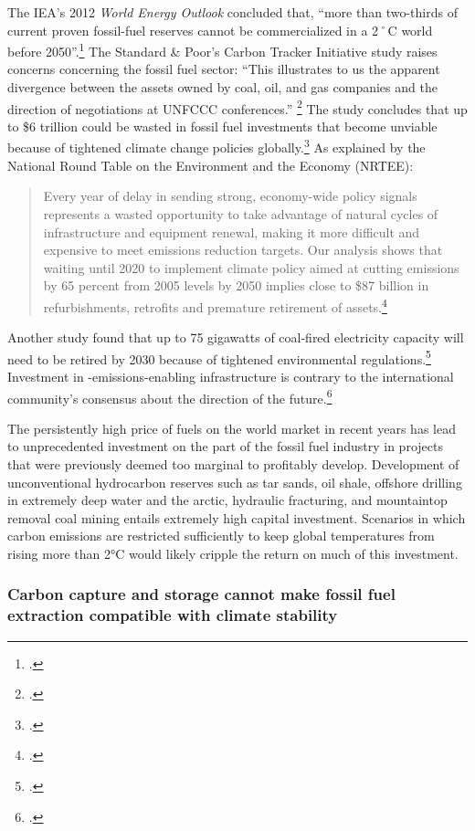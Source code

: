 \documentclass[10pt]{article}
\begin{document}
The IEA's 2012 \emph{World Energy Outlook} concluded that, ``more than two-thirds of current proven fossil-fuel reserves cannot be commercialized in a 2˚C world before 2050''.\footcite{IEA2012}
The Standard \& Poor's Carbon Tracker Initiative study raises concerns concerning the fossil fuel sector: ``This illustrates to us the apparent divergence between the assets owned by coal, oil, and gas companies and the direction of negotiations at UNFCCC conferences.'' \footcite{SandPConstrained}
The study concludes that up to \$6 trillion could be wasted in fossil fuel investments that become unviable because of tightened climate change policies globally.\footcite[][]{SixTrillionBubble}
As explained by the National Round Table on the Environment and the Economy (NRTEE):
\begin{quote}
Every year of delay in sending strong, economy-wide policy signals represents a wasted opportunity to take advantage of natural cycles of infrastructure and equipment renewal, making it more difficult and expensive to meet emissions reduction targets. Our analysis shows that waiting until 2020 to implement climate policy aimed at cutting emissions by 65 percent from 2005 levels by 2050 implies close to \$87 billion in refurbishments, retrofits and premature retirement of assets.\footcite[][p. 19]{FramingFuture}
\end{quote}
Another study found that up to 75 gigawatts of coal-fired electricity capacity will need to be retired by 2030 because of tightened environmental regulations.\footcite[][p. 10]{RisksInCoal}
Investment in -emissions-enabling infrastructure is contrary to the international community's consensus about the direction of the future.\footcite[][]{Watkins2013}



The persistently high price of fuels on the world market in recent years has lead to unprecedented investment on the part of the fossil fuel industry in projects that were previously deemed too marginal to profitably develop. 
Development of unconventional hydrocarbon reserves such as tar sands, oil shale, offshore drilling in extremely deep water and the arctic, hydraulic fracturing, and mountaintop removal coal mining entails extremely high capital investment. 
Scenarios in which carbon emissions are restricted sufficiently to keep global temperatures from rising more than 2°C would likely cripple the return on much of this investment.



	\subsubsection{Carbon capture and storage cannot make fossil fuel extraction compatible with climate stability}
	\label{sec:CCSWontHelp}
\end{document}
